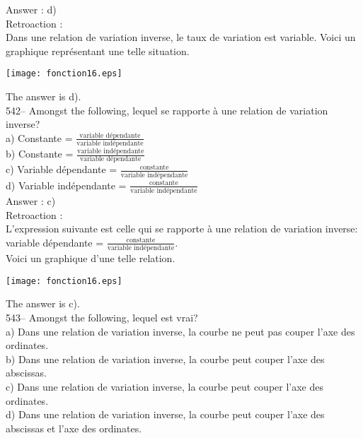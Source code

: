 ﻿\documentclass[letterpaper, 12pt]{article}
\begin{document}
Answer : d)\\

Retroaction : \\
Dans une relation de variation inverse, le taux de variation est variable.
Voici un graphique repr\'esentant une telle situation.\\
    \begin{center}
    \texttt{[image: fonction16.eps]}
    \end{center}

The answer is d).\\


542-- Amongst the following, lequel se rapporte \`a une relation
de variation inverse?\\[2mm]
a) Constante = $\frac{\textrm{variable d\'ependante}}{\textrm{variable
ind\'ependante}}$\\[2mm]
b) Constante = $\frac{\textrm{variable ind\'ependante}}{\textrm{variable
d\'ependante}}$\\[2mm]
c) Variable d\'ependante = $\frac{\textrm{constante}}{\textrm{variable
ind\'ependante}}$\\[2mm]
d) Variable ind\'ependante = $\frac{\textrm{constante}}{\textrm{variable
ind\'ependante}}$\\

Answer : c)\\

Retroaction : \\
L'expression suivante est celle qui se rapporte \`a une relation de
variation inverse:\\[2mm]
variable d\'ependante = $\frac{\textrm{constante}}{\textrm{variable
ind\'ependante}}$.\\[2mm]
Voici un graphique d'une telle relation.
    \begin{center}
    \texttt{[image: fonction16.eps]}
    \end{center}
The answer is c).\\

543-- Amongst the following, lequel est vrai?\\
a) Dans une relation de variation inverse, la courbe ne peut pas couper
l'axe des ordinates.\\
b) Dans une relation de variation inverse, la courbe peut couper l'axe des
abscissas.\\
c) Dans une relation de variation inverse, la courbe peut couper l'axe des
ordinates.\\
d) Dans une relation de variation inverse, la courbe peut couper l'axe des
abscissas et l'axe des ordinates.\\
\end{document}
